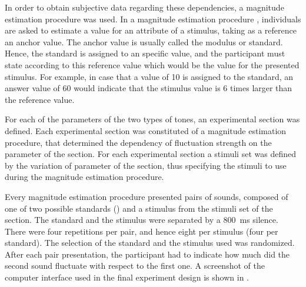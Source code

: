 \documentclass[../main.tex]{subfiles}
\begin{document}
In order to obtain subjective data regarding these dependencies, a magnitude
estimation procedure was used. In a magnitude estimation procedure
\cite[pp.~9]{Fastl2007Psychoacoustics}, individuals are asked to estimate a
value for an attribute of a stimulus, taking as a reference an anchor value.
The anchor value is usually called the modulus or standard. Hence, the standard
is assigned to an specific value, and the participant must state according to
this reference value which would be the value for the presented stimulus. For
example, in case that a value of 10 is assigned to the standard, an answer value
of 60 would indicate that the stimulus value is 6 times larger than the
reference value.

For each of the parameters of the two types of tones, an experimental section
was defined. Each experimental section was constituted of a magnitude estimation
procedure, that determined the dependency of fluctuation strength on the
parameter of the section. For each experimental section a stimuli set was
defined by the variation of parameter of the section, thus specifying the
stimuli to use during the magnitude estimation procedure.

Every magnitude estimation procedure presented pairs of sounds, composed of one
of two possible standards () and a stimulus from the
stimuli set of the section. The standard and the stimulus were separated by a
800~ms silence. There were four repetitions per pair, and hence eight per
stimulus (four per standard). The selection of the standard and the stimulus
used was randomized. After each pair presentation, the participant had to
indicate how much did the second sound fluctuate with respect to the first one.
A screenshot of the computer interface used in the final experiment design is
shown in .
\end{document}
